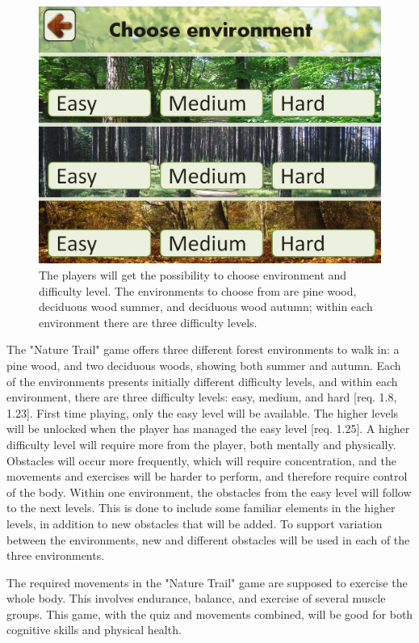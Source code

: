 \begin{figure} [H]
\centering
\includegraphics[scale=0.25]{chooseEnvironment.jpg}
\caption[Choice of environment and difficulty level]{The players will get the possibility to choose environment and difficulty level. The environments to choose from are pine wood, deciduous wood summer, and deciduous wood autumn; within each environment there are three difficulty levels.}
\label{fig:omgivelseNivaa}
\end{figure}

The "Nature Trail" game offers three different forest environments to walk in: a pine wood, and two deciduous woods, showing both summer and autumn. Each of the environments presents initially different difficulty levels, and within each environment, there are three difficulty levels: easy, medium, and hard [req. 1.8, 1.23]. First time playing, only the easy level will be available. The higher levels will be unlocked when the player has managed the easy level [req. 1.25]. A higher difficulty level will require more from the player, both mentally and physically. Obstacles will occur more frequently, which will require concentration, and the movements and exercises will be harder to perform, and therefore require control of the body. Within one environment, the obstacles from the easy level will follow to the next levels. This is done to include some familiar elements in the higher levels, in addition to new obstacles that will be added. To support variation between the environments, new and different obstacles will be used in each of the three environments.  

The required movements in the "Nature Trail" game are supposed to exercise the whole body. This involves endurance, balance, and exercise of several muscle groups. This game, with the quiz and movements combined, will be good for both cognitive skills and physical health.     

